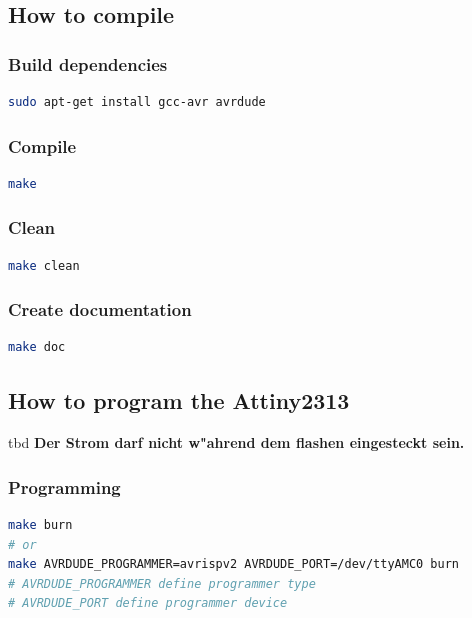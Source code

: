 \subsection{How to compile}
\subsubsection{Build dependencies}
\begin{lstlisting}[caption={Build dependencies},language=sh,label=lst:builddep]
sudo apt-get install gcc-avr avrdude
\end{lstlisting}
\vspace{0.5cm}

\subsubsection{Compile}
\begin{lstlisting}[caption={Compile},language=sh,label=lst:makeall]
make
\end{lstlisting}
\vspace{0.5cm}

\subsubsection{Clean}
\begin{lstlisting}[caption={Clean},language=sh,label=lst:makeclean]
make clean
\end{lstlisting}
\vspace{0.5cm}

\subsubsection{Create documentation}
\begin{lstlisting}[caption={Create documentation},language=sh,label=lst:builddoc]
make doc
\end{lstlisting}
\vspace{0.5cm}


\subsection{How to program the Attiny2313}
tbd %
\textbf{Der Strom darf nicht w"ahrend dem flashen eingesteckt sein.}

\subsubsection{Programming}
\begin{lstlisting}[caption={Programming},language=sh,label=lst:makeburn]
make burn
# or
make AVRDUDE_PROGRAMMER=avrispv2 AVRDUDE_PORT=/dev/ttyAMC0 burn
# AVRDUDE_PROGRAMMER define programmer type
# AVRDUDE_PORT define programmer device
\end{lstlisting}
\vspace{0.5cm}




